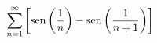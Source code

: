 \item $\displaystyle\sum_{n=1}^\infty \left[ \operatorname{sen}\left(\frac{1}{n}\right) - \operatorname{sen}\left(\frac{1}{n+1}\right) \right]$
